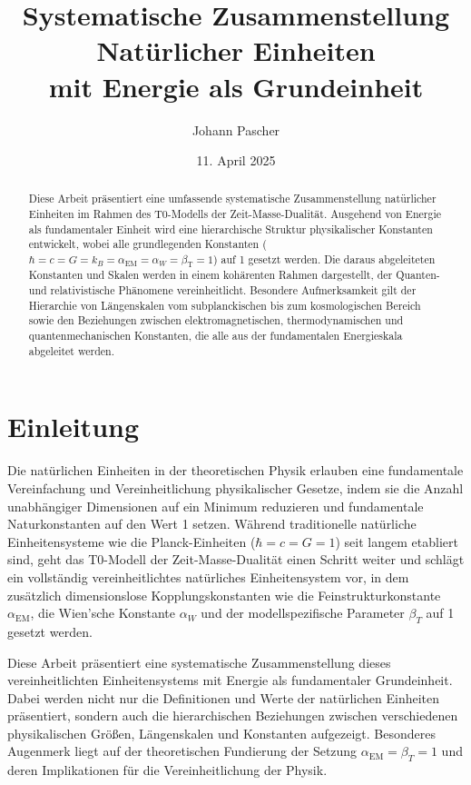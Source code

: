 \documentclass[12pt,a4paper]{article}
\title{Systematische Zusammenstellung Natürlicher Einheiten \\mit Energie als Grundeinheit}
\author{Johann Pascher}
\date{11. April 2025}
\newcommand{\alphaEM}{\alpha_{\text{EM}}}
\newcommand{\betaT}{\beta_{\text{T}}}
\begin{document}
	
	\maketitle
	
	\begin{abstract}
		Diese Arbeit präsentiert eine umfassende systematische Zusammenstellung natürlicher Einheiten im Rahmen des T0-Modells der Zeit-Masse-Dualität. Ausgehend von Energie als fundamentaler Einheit wird eine hierarchische Struktur physikalischer Konstanten entwickelt, wobei alle grundlegenden Konstanten ($\hbar = c = G = k_B = \alphaEM = \alpha_W = \betaT = 1$) auf 1 gesetzt werden. Die daraus abgeleiteten Konstanten und Skalen werden in einem kohärenten Rahmen dargestellt, der Quanten- und relativistische Phänomene vereinheitlicht. Besondere Aufmerksamkeit gilt der Hierarchie von Längenskalen vom subplanckischen bis zum kosmologischen Bereich sowie den Beziehungen zwischen elektromagnetischen, thermodynamischen und quantenmechanischen Konstanten, die alle aus der fundamentalen Energieskala abgeleitet werden.
	\end{abstract}
	
	\tableofcontents
	\newpage
	
	\section{Einleitung}
	
	Die natürlichen Einheiten in der theoretischen Physik erlauben eine fundamentale Vereinfachung und Vereinheitlichung physikalischer Gesetze, indem sie die Anzahl unabhängiger Dimensionen auf ein Minimum reduzieren und fundamentale Naturkonstanten auf den Wert 1 setzen. Während traditionelle natürliche Einheitensysteme wie die Planck-Einheiten ($\hbar = c = G = 1$) seit langem etabliert sind, geht das T0-Modell der Zeit-Masse-Dualität einen Schritt weiter und schlägt ein vollständig vereinheitlichtes natürliches Einheitensystem vor, in dem zusätzlich dimensionslose Kopplungskonstanten wie die Feinstrukturkonstante $\alpha_{\text{EM}}$, die Wien'sche Konstante $\alpha_W$ und der modellspezifische Parameter $\beta_T$ auf 1 gesetzt werden.
	
	Diese Arbeit präsentiert eine systematische Zusammenstellung dieses vereinheitlichten Einheitensystems mit Energie als fundamentaler Grundeinheit. Dabei werden nicht nur die Definitionen und Werte der natürlichen Einheiten präsentiert, sondern auch die hierarchischen Beziehungen zwischen verschiedenen physikalischen Größen, Längenskalen und Konstanten aufgezeigt. Besonderes Augenmerk liegt auf der theoretischen Fundierung der Setzung $\alpha_{\text{EM}} = \beta_T = 1$ und deren Implikationen für die Vereinheitlichung der Physik.
	
\end{document}
